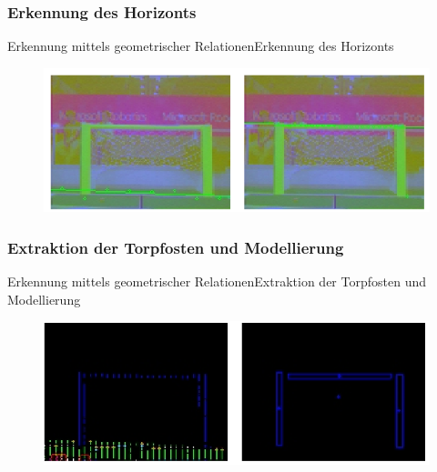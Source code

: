 \documentclass{beamer}
\begin{document}
\subsubsection{Erkennung des Horizonts}
\begin{frame}{Erkennung mittels geometrischer Relationen}{Erkennung des Horizonts}
\begin{figure}[htp]
\centering
\includegraphics[scale=0.6]{geometric-plane.png}
\end{figure}
\end{frame}

\subsubsection{Extraktion der Torpfosten und Modellierung}
\begin{frame}{Erkennung mittels geometrischer Relationen}{Extraktion der Torpfosten und Modellierung}
\begin{figure}[htp]
\centering
\includegraphics[scale=0.6]{goal-blobs.png}
\end{figure}
\end{frame}
\end{document}
